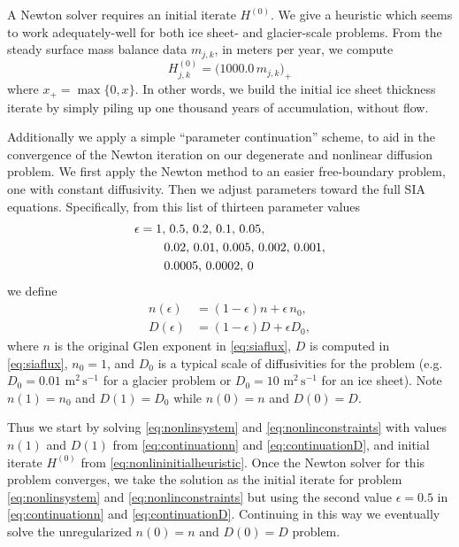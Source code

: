 \documentclass[twocolumn,letterpaper]{igs}
\newcommand\eps{\epsilon}
\begin{document}
A Newton solver requires an initial iterate $H^{(0)}$.  We give a heuristic which seems to work adequately-well for both ice sheet- and glacier-scale problems.  From the steady surface mass balance data $m_{j,k}$, in meters per year, we compute
\begin{equation}
H_{j,k}^{(0)} = \big(1000.0\,m_{j,k}\big)_+  \label{eq:nonlininitialheuristic}
\end{equation}
where $x_+ = \max\{0,x\}$.  In other words, we build the initial ice sheet thickness iterate by simply piling up one thousand years of accumulation, without flow.

Additionally we apply a simple ``parameter continuation'' scheme, to aid in the convergence of the Newton iteration on our degenerate and nonlinear diffusion problem.  We first apply the Newton method to an easier free-boundary problem, one with constant diffusivity.  Then we adjust parameters toward the full SIA equations.  Specifically, from this list of thirteen parameter values
\begin{align}
\eps &= 1,\, 0.5,\, 0.2,\, 0.1,\, 0.05, \label{eq:continuationseq} \\
     &\qquad 0.02,\, 0.01,\, 0.005,\, 0.002,\, 0.001, \notag \\
     &\qquad 0.0005,\, 0.0002,\, 0 \notag
\end{align}
we define
\begin{align}
n(\eps) &= (1-\eps) n + \eps\, n_0,  \label{eq:continuationn} \\
D(\eps) &= (1-\eps) D + \eps D_0,  \label{eq:continuationD}
\end{align}
where $n$ is the original Glen exponent in \eqref{eq:siaflux}, $D$ is computed in \eqref{eq:siaflux}, $n_0=1$, and $D_0$ is a typical scale of diffusivities for the problem (e.g.~$D_0=0.01$ $\text{m}^2\,\text{s}^{-1}$ for a glacier problem or $D_0=10$ $\text{m}^2\,\text{s}^{-1}$ for an ice sheet).  Note $n(1)=n_0$ and $D(1)=D_0$ while $n(0)=n$ and $D(0)=D$.

Thus we start by solving \eqref{eq:nonlinsystem} and \eqref{eq:nonlinconstraints} with values $n(1)$ and $D(1)$ from \eqref{eq:continuationn} and \eqref{eq:continuationD}, and initial iterate $H^{(0)}$ from \eqref{eq:nonlininitialheuristic}.  Once the Newton solver for this problem converges, we take the solution as the initial iterate for problem \eqref{eq:nonlinsystem} and \eqref{eq:nonlinconstraints} but using the second value $\eps=0.5$ in \eqref{eq:continuationn} and \eqref{eq:continuationD}.  Continuing in this way we eventually solve the unregularized $n(0)=n$ and $D(0)=D$ problem.
\end{document}
